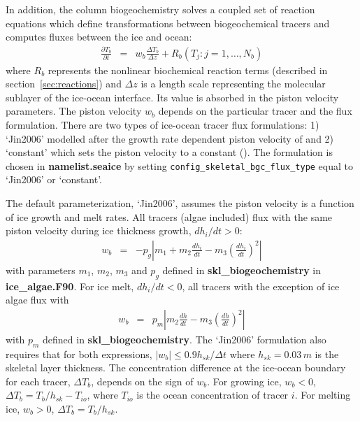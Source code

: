 In addition, the column biogeochemistry solves a coupled set of reaction equations which define transformations between biogeochemical tracers and computes fluxes between the ice and ocean:
\begin{eqnarray}
\label{eqn:bgc_Tracer}
\frac{\partial T_b}{\partial t}  & = & w_b \frac{\Delta T_b}{\Delta z} +  R_b({T_j : j = 1,\ldots,N_b})
\end{eqnarray}
where $R_b$ represents the nonlinear biochemical reaction terms
(described in section~\ref{sec:reactions})
 and $\Delta z$ is a length scale
representing the molecular sublayer of the ice-ocean interface.  Its
value is absorbed in the piston velocity parameters.  The piston
velocity $w_b$  depends
on the particular tracer and the flux formulation.  There are two types of ice-ocean tracer flux formulations: 1)
`Jin2006' modelled after the growth rate dependent piston velocity of \cite{Jin:sklbgc:2006}
and 2) `constant' which sets the piston velocity to a constant (\cite{Elliott:sklbgc:2012}).
The formulation is chosen in  {\bf namelist.seaice} by setting {\tt config\_skeletal\_bgc\_flux\_type} equal to
`Jin2006' or `constant'. 

The default parameterization,  `Jin2006', assumes the piston velocity is a function of ice growth and melt rates.  All tracers (algae included) flux with the same piston velocity during ice thickness growth,
 $dh_i/dt > 0$:
\begin{eqnarray}
\label{eqn:pwJin_growth}
w_b  & =  & - p_g\left|m_1 + m_2 \frac{dh_i}{dt} - m_3
  \left(\frac{dh_i}{dt} \right)^2\right|
\end{eqnarray}
with parameters $m_1$, $m_2$, $m_3$ and $p_g$ defined
in {\bf skl\_biogeochemistry} in {\bf ice\_algae.F90}. 
For ice melt, $dh_i/dt < 0$, all tracers with the exception of ice algae
flux with 
\begin{eqnarray}
\label{eqn:pwJin_melt}
w_b  & =  & p_m\left|m_2 \frac{dh}{dt} - m_3
    \left(\frac{dh}{dt}  \right)^2\right| 
\end{eqnarray}
with $p_m$ defined
in {\bf skl\_biogeochemistry}. 
The `Jin2006' formulation also requires that for both expressions, $|w_b| \leq 0.9
h_{sk}/\Delta t$ where $h_{sk}=0.03\,m$ is the skeletal layer thickness.  
The concentration difference at the ice-ocean boundary for each tracer, $\Delta
T_b$, depends on the sign of $w_b$.  For growing ice, $w_b < 0$,
$\Delta T_b  = T_b/h_{sk} - T_{io}$, where $T_{io}$ is the ocean
concentration of tracer $i$. For melting
ice,  $w_b > 0$, $\Delta T_b = T_b/h_{sk}$.

